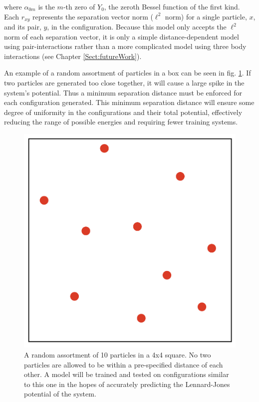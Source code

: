 where $\alpha_{0m}$ is the $m$-th zero of $Y_0$, the zeroth Bessel function of the first kind. Each $r_{xy}$ represents the separation vector norm ($\ell^2$ norm) for a single particle, $x$, and its pair, $y$, in the configuration. Because this model only accepts the $\ell^2$ norm of each separation vector, it is only a simple distance-dependent model using pair-interactions rather than a more complicated model using three body interactions (see Chapter \ref{Sect:futureWork}).

\par An example of a random assortment of particles in a box can be seen in fig. \ref{fig:tenParticles}. If two particles are generated too close together, it will cause a large spike in the system's potential. Thus a minimum separation distance must be enforced for each configuration generated. This minimum separation distance will ensure some degree of uniformity in the configurations and their total potential, effectively reducing the range of possible energies and requiring fewer training systems. 

\begin{figure}%
\centering
\includegraphics[scale = 0.3]{Figures/tenParticles}
\caption{A random assortment of 10 particles in a 4x4 square. No two particles are allowed to be within a pre-specified distance of each other. A model will be trained and tested on configurations similar to this one in the hopes of accurately predicting the Lennard-Jones potential of the system. 
\label{fig:tenParticles}} 
\end{figure}


